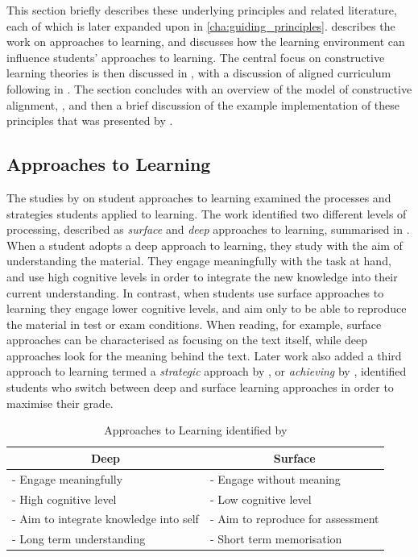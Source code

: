 This section briefly describes these underlying principles and related literature, each of which is later expanded upon in \cref{cha:guiding_principles}.  describes the work on approaches to learning, and discusses how the learning environment can influence students' approaches to learning. The central focus on constructive learning theories is then discussed in , with a discussion of aligned curriculum following in . The section concludes with an overview of the model of constructive alignment, , and then a brief discussion of the example implementation of these principles that was presented by \citet{Biggs:1996c}.

\subsection{Approaches to Learning} %
\label{sub:approaches_to_learning}

The studies by \citet{Marton:1976a, Marton:1976b,Marton:2005} on student approaches to learning examined the processes and strategies students applied to learning. The work identified two different levels of processing, described as \emph{surface} and \emph{deep} approaches to learning, summarised in . When a student adopts a deep approach to learning, they study with the aim of understanding the material. They engage meaningfully with the task at hand, and use high cognitive levels in order to integrate the new knowledge into their current understanding. In contrast, when students use surface approaches to learning they engage lower cognitive levels, and aim only to be able to reproduce the material in test or exam conditions. When reading, for example, surface approaches can be characterised as focusing on the text itself, while deep approaches look for the meaning behind the text. Later work also added a third approach to learning termed a \emph{strategic} approach by \citet{Ramsden:1983}, or \emph{achieving} by  \citet{Biggs:1987}, identified students who switch between deep and surface learning approaches in order to maximise their grade. 

\begin{table}[h]
	\centering
	\caption{Approaches to Learning identified by \citet{Marton:1976a, Marton:1976b,Marton:2005}}
	\label{tbl:learning_approach}
	\begin{tabular}{l|l}
		\multicolumn{1}{c|}{\textbf{Deep}} & \multicolumn{1}{c}{\textbf{Surface}} \\
		\hline
		- Engage meaningfully & - Engage without meaning \\
		- High cognitive level & - Low cognitive level \\
		- Aim to integrate knowledge into self & - Aim to reproduce for assessment \\
		- Long term understanding & - Short term memorisation \\
	\end{tabular}
\end{table}

